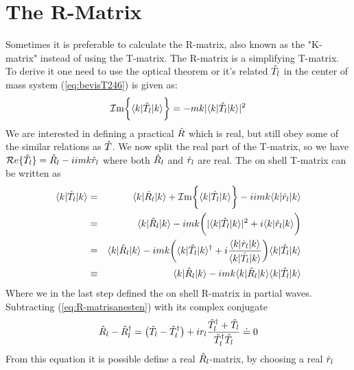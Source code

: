 \section{The R-Matrix}
Sometimes it is preferable to calculate the R-matrix, also known as the "K-matrix" instead of using the T-matrix.
The R-matrix is a simplifying T-matrix. To derive it one need to use the optical theorem 
or it's related $\hat{T}_l$ in the center of mass system (\ref{eq:bevisT246}) is given as:
\begin{eqnarray}\label{eq:bevisTferd}
{\cal I}\textrm{m}\bigg\{\braketm{{ k}}{\op{T}_l}{{ k}}\bigg\}=
- m k |\braketm{{   k}}{\op{T}_l}{{ k}}|^2
\end{eqnarray}
We are interested in defining a practical $\hat{R}$ which is real, but still obey some of the similar relations as $\hat{T}$. We now
split the real part of the T-matrix, so we have ${\cal R}e\{\hat{T}_l\}=\hat{R}_l-iimk\hat{r}_l$ where both $\hat{R}_l$ and $\hat{r}_l$ are real. 
The on shell T-matrix can be written as
\begin{eqnarray}\label{eq:R-matrisanesten}
\braketm{{   k}}{\op{T}_l}{{ k}} &=& \braketm{{   k}}{\op{R}_l}{{ k}} +{\cal I}\textrm{m} \bigg\{\braketm{{   k}}{\op{T}_l}{{ k}}\bigg\}
-iimk\braketm{{   k}}{\op{r}_l}{{ k}}\nonumber\\
&=&
\braketm{{   k}}{\op{R}_l}{{ k}}  -imk\bigg(|\braketm{{   k}}{\op{T}_l}{{ k}}|^2 +i\braketm{{   k}}{\op{r}_l}{{ k}}\bigg)\nonumber\\
&=&
\braketm{{   k}}{\op{R}_l}{{ k}}  -imk\bigg(\braketm{{   k}}{\op{T}_l}{{ k}}^\dagger +i\frac{\braketm{{   k}}{\op{r}_l}{{ k}}}
{\braketm{{   k}}{\op{T}_l}{{ k}}}\bigg)\braketm{{   k}}{\op{T}_l}{{ k}}\nonumber\\
&\equiv&
\braketm{{   k}}{\op{R}_l}{{ k}}  -imk\braketm{{   k}}{\op{R}_l}{{ k}}\braketm{{   k}}{\op{T}_l}{{ k}}
\end{eqnarray}
Where we in the last step defined the on shell R-matrix in partial waves.%
Subtracting (\ref{eq:R-matrisanesten}) with its complex conjugate
\begin{eqnarray}\label{eq:bevisTferd1}
{\op{R}_l}-{\op{R}_l}^\dagger=\big(\op{T}_l-\op{T}^\dagger_l\big)+ ir_l \frac{\op{T}^\dagger_l+\op{T}_l}{\op{T}^\dagger_l\op{T}_l}\doteq 0
\end{eqnarray}
From this equation it is possible define a real $\hat{R}_l$-matrix, by choosing a real $\hat{r}_l$ 
